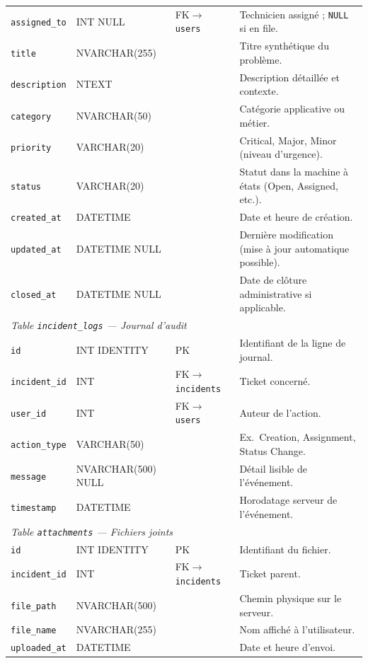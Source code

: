 \begin{longtable}{@{}llp{1.4cm}p{6.2cm}@{}}
\texttt{assigned\_to} & INT NULL & FK$\rightarrow$\texttt{users} & Technicien assigné ; \texttt{NULL} si en file. \\
\texttt{title} & NVARCHAR(255) & & Titre synthétique du problème. \\
\texttt{description} & NTEXT & & Description détaillée et contexte. \\
\texttt{category} & NVARCHAR(50) & & Catégorie applicative ou métier. \\
\texttt{priority} & VARCHAR(20) & & Critical, Major, Minor (niveau d'urgence). \\
\texttt{status} & VARCHAR(20) & & Statut dans la machine à états (Open, Assigned, etc.). \\
\texttt{created\_at} & DATETIME & & Date et heure de création. \\
\texttt{updated\_at} & DATETIME NULL & & Dernière modification (mise à jour automatique possible). \\
\texttt{closed\_at} & DATETIME NULL & & Date de clôture administrative si applicable. \\
\midrule
\multicolumn{4}{l}{\textit{Table \texttt{incident\_logs} — Journal d'audit}} \\
\midrule
\texttt{id} & INT IDENTITY & PK & Identifiant de la ligne de journal. \\
\texttt{incident\_id} & INT & FK$\rightarrow$\texttt{incidents} & Ticket concerné. \\
\texttt{user\_id} & INT & FK$\rightarrow$\texttt{users} & Auteur de l'action. \\
\texttt{action\_type} & VARCHAR(50) & & Ex.\ Creation, Assignment, Status Change. \\
\texttt{message} & NVARCHAR(500) NULL & & Détail lisible de l'événement. \\
\texttt{timestamp} & DATETIME & & Horodatage serveur de l'événement. \\
\midrule
\multicolumn{4}{l}{\textit{Table \texttt{attachments} — Fichiers joints}} \\
\midrule
\texttt{id} & INT IDENTITY & PK & Identifiant du fichier. \\
\texttt{incident\_id} & INT & FK$\rightarrow$\texttt{incidents} & Ticket parent. \\
\texttt{file\_path} & NVARCHAR(500) & & Chemin physique sur le serveur. \\
\texttt{file\_name} & NVARCHAR(255) & & Nom affiché à l'utilisateur. \\
\texttt{uploaded\_at} & DATETIME & & Date et heure d'envoi. \\
\end{longtable}

